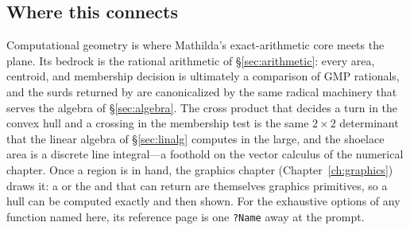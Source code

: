 
\subsection*{Where this connects}

Computational geometry is where Mathilda's exact-arithmetic core meets the plane.
Its bedrock is the rational arithmetic of \S\ref{sec:arithmetic}: every area,
centroid, and membership decision is ultimately a comparison of GMP rationals, and
the surds returned by  are canonicalized by the same radical
machinery that serves the algebra of \S\ref{sec:algebra}. The cross product that
decides a turn in the convex hull and a crossing in the membership test is the
same \(2\times2\) determinant that the linear algebra of \S\ref{sec:linalg}
computes in the large, and the shoelace area is a discrete line integral---a
foothold on the vector calculus of the numerical chapter. Once a region is in
hand, the graphics chapter (Chapter~\ref{ch:graphics}) draws it: a 
or the  and  that  can return are
themselves graphics primitives, so a hull can be computed exactly and then shown.
For the exhaustive options of any function named here, its reference page is one
\texttt{?Name} away at the prompt.
